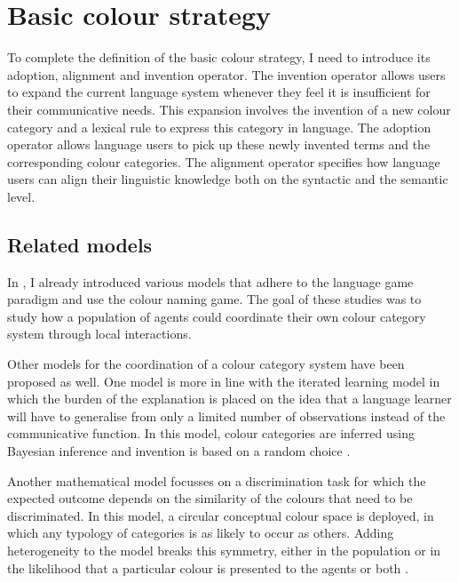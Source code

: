 \chapter{Basic colour strategy}
\label{s:basic-operators}

\setcounter{figure}{1}

To complete the definition of the basic colour strategy, I need
to introduce its adoption, alignment and invention operator. The
invention operator allows users to expand the current language system
whenever they feel it is insufficient for their communicative
needs. This expansion involves the invention of a new colour category
and a lexical rule to express this category in language. The adoption
operator allows language users to pick up these newly invented terms
and the corresponding colour categories. The alignment operator
specifies how language users can align their linguistic knowledge both
on the syntactic and the semantic level.

\section{Related models}

In , I already introduced various models
\citep{steels05coordinating, belpaeme05explaining, belpaeme07language,
  puglisi08cultural, baronchelli10modeling} that adhere to the
language game paradigm and use the colour naming game. The goal of
these studies was to study how a population of agents could coordinate
their own colour category system through local interactions.

Other models for the coordination of a colour category system have
been proposed as well. One model is more in line with the iterated
learning model \citep{smith03iterated} in which the burden of the
explanation is placed on the idea that a language learner will have to
generalise from only a limited number of observations instead of the
communicative function. In this model, colour categories are inferred
using Bayesian inference and invention is based on a random choice
\citep{dowman07explaining}.

Another mathematical model focusses on a discrimination task for which
the expected outcome depends on the similarity of the colours that
need to be discriminated. In this model, a circular conceptual colour
space is deployed, in which any typology of categories is as likely to
occur as others. Adding heterogeneity to the model breaks this symmetry, either in the
population or in the likelihood that a particular colour is presented
to the agents or both \citep{komarova08population}.

